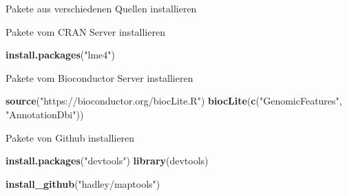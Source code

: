 \documentclass[ignorenonframetext,]{beamer}
\newenvironment{Shaded}{\begin{snugshade}}{\end{snugshade}}
\newcommand{\KeywordTok}[1]{\textcolor[rgb]{0.26,0.66,0.93}{\textbf{#1}}}
\newcommand{\StringTok}[1]{\textcolor[rgb]{0.02,0.61,0.04}{#1}}
\newcommand{\NormalTok}[1]{\textcolor[rgb]{0.74,0.68,0.62}{#1}}
\begin{document}
\begin{frame}[fragile]{Pakete aus verschiedenen Quellen installieren}

\begin{block}{Pakete vom CRAN Server installieren}

\begin{Shaded}
\begin{Highlighting}[]
\KeywordTok{install.packages}\NormalTok{(}\StringTok{"lme4"}\NormalTok{)}
\end{Highlighting}
\end{Shaded}

\end{block}

\begin{block}{Pakete vom Bioconductor Server installieren}

\begin{Shaded}
\begin{Highlighting}[]
\KeywordTok{source}\NormalTok{(}\StringTok{"https://bioconductor.org/biocLite.R"}\NormalTok{)}
\KeywordTok{biocLite}\NormalTok{(}\KeywordTok{c}\NormalTok{(}\StringTok{"GenomicFeatures"}\NormalTok{, }\StringTok{"AnnotationDbi"}\NormalTok{))}
\end{Highlighting}
\end{Shaded}

\end{block}

\begin{block}{Pakete von Github installieren}

\begin{Shaded}
\begin{Highlighting}[]
\KeywordTok{install.packages}\NormalTok{(}\StringTok{"devtools"}\NormalTok{)}
\KeywordTok{library}\NormalTok{(devtools)}

\KeywordTok{install_github}\NormalTok{(}\StringTok{"hadley/maptools"}\NormalTok{)}
\end{Highlighting}
\end{Shaded}

\end{block}

\end{frame}
\end{document}
